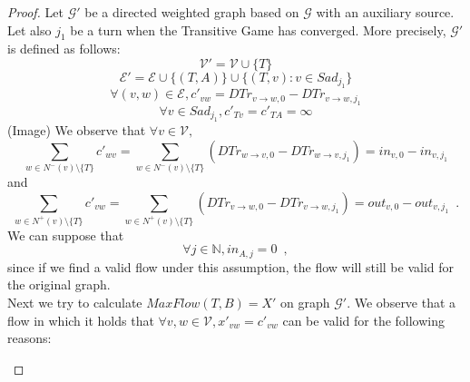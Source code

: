 \documentclass[11pt]{llncs}
\begin{document}
    \begin{proof}
       Let $\mathcal{G}'$ be a directed weighted graph based on $\mathcal{G}$ with an auxiliary source. Let also $j_1$ be a
       turn when the Transitive Game has converged. More precisely, $\mathcal{G}'$ is defined as follows:
       \begin{equation}
          \mathcal{V}' = \mathcal{V} \cup \{T\}
       \end{equation}
       \begin{equation}
          \mathcal{E}' = \mathcal{E} \cup \{(T, A)\} \cup \{(T, v) : v \in Sad_{j_1}\}
       \end{equation}
       \begin{equation}
          \forall (v, w) \in \mathcal{E}, c'_{vw} = DTr_{v \rightarrow w, 0} - DTr_{v \rightarrow w, j_1}
       \end{equation}
       \begin{equation}
          \forall v \in Sad_{j_1}, c'_{Tv} = c'_{TA} = \infty
       \end{equation}
       (Image)
       We observe that $\forall v \in \mathcal{V},$
       \begin{equation}
       \label{gameflowin}
          \sum\limits_{w \in N^{-}\left(v\right) \setminus \{T\}}c'_{wv} = \sum\limits_{w \in
          N^{-}\left(v\right) \setminus \{T\}}\left(DTr_{w \rightarrow v, 0} - DTr_{w \rightarrow v, j_1}\right) = in_{v, 0}
          - in_{v, j_1}
       \end{equation}
       and
       \begin{equation}
       \label{gameflowout}
          \sum\limits_{w \in N^{+}\left(v\right) \setminus \{T\}}c'_{vw} = \sum\limits_{w \in N^{+}\left(v\right) \setminus
          \{T\}}\left(DTr_{v \rightarrow w, 0} - DTr_{v \rightarrow w, j_1}\right) = out_{v, 0} - out_{v, j_1} \enspace.
       \end{equation}
       We can suppose that
       \begin{equation}
       \label{Aincoming}
          \forall j \in \mathbb{N}, in_{A, j} = 0 \enspace,
       \end{equation}
       since if we find a valid flow under this assumption, the flow will still be valid for the original graph. \\
       Next we try to calculate $MaxFlow\left(T, B\right) = X'$ on graph $\mathcal{G}'$. We observe that a flow in which it
       holds that $\forall v, w \in \mathcal{V}, x'_{vw} = c'_{vw}$ can be valid for the following reasons:
       \begin{itemize}

\end{itemize}
\end{proof}
\end{document}
